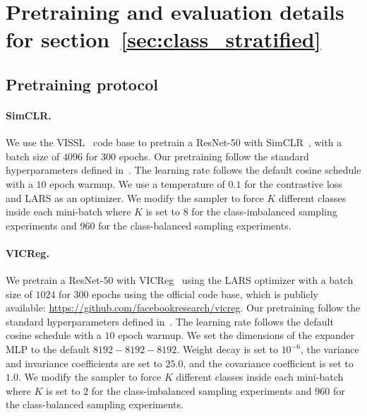\documentclass{article} %
\begin{document}
\section{Pretraining and evaluation details for section~\ref{sec:class_stratified}}
\label{apndx:classstratified_sampling}

\subsection{Pretraining protocol}

\paragraph{SimCLR.} We use the VISSL~\citep{goyal2021vissl} code base to pretrain a ResNet-50 with SimCLR~\citep{chen2020simple}, with a batch size of $4096$ for $300$ epochs.
Our pretraining follow the standard hyperparameters defined in~\citet{chen2020simple}.
The learning rate follows the default cosine schedule with a $10$ epoch warmup. We use a temperature of $0.1$ for the contrastive loss and LARS \citep{you2017large} as an optimizer. We modify the sampler to force $K$ different classes inside each mini-batch where $K$ is set to $8$ for the  class-imbalanced sampling experiments and $960$ for the class-balanced sampling experiments.

\paragraph{VICReg.}
We pretrain a ResNet-50 with VICReg~\citep{bardes2021vicreg} using the LARS optimizer with a batch size of $1024$ for $300$ epochs using the official code base, which is publicly available: \url{https://github.com/facebookresearch/vicreg}.
Our pretraining follow the standard hyperparameters defined in~\citet{bardes2021vicreg}.
The learning rate follows the default cosine schedule with a $10$ epoch warmup.
We set the dimensions of the expander MLP to the default $8192-8192-8192$.
Weight decay is set to $10^{-6}$, the variance and invariance coefficients are set to $25.0$, and the covariance coefficient is set to $1.0$.
We modify the sampler to force $K$ different classes inside each mini-batch where $K$ is set to $2$ for the  class-imbalanced sampling experiments and $960$ for the class-balanced sampling experiments.
 
\end{document}
